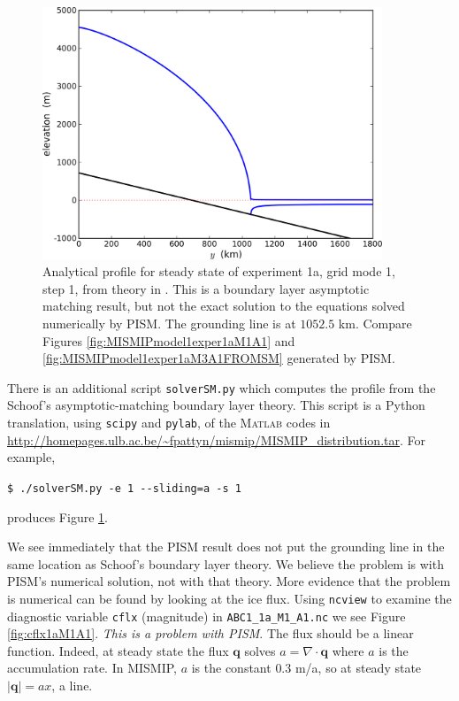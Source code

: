 \documentclass[11pt,final]{amsart}
\newcommand{\Matlab}{\textsc{Matlab}\xspace}
\newcommand{\bq}{\mathbf{q}}
\newcommand{\Div}{\nabla\cdot}
\begin{document}
\begin{figure}[ht]
\includegraphics[width=4.0in,keepaspectratio=true]{SM_1a_A1}
\caption{Analytical profile for steady state of experiment 1a, grid mode 1, step 1, from theory in \cite{SchoofMarine1}.  This is a boundary layer asymptotic matching result, but not the exact solution to the equations solved numerically by PISM.  The grounding line is at $1052.5$ km.  Compare Figures \ref{fig:MISMIPmodel1exper1aM1A1} and \ref{fig:MISMIPmodel1exper1aM3A1FROMSM} generated by PISM.}
\label{fig:SMexper1aM1A1}
\end{figure}

There is an additional script \verb|solverSM.py| which computes the profile from the Schoof's \cite{SchoofMarine1} asymptotic-matching boundary layer theory.  This script is a Python translation, using \verb|scipy| and \verb|pylab|, of the \Matlab codes in \url{http://homepages.ulb.ac.be/~fpattyn/mismip/MISMIP_distribution.tar}.  For example,

\verb|$ ./solverSM.py -e 1 --sliding=a -s 1|

\noindent produces Figure \ref{fig:SMexper1aM1A1}.

We see immediately that the PISM result does not put the grounding line in the same location as Schoof's boundary layer theory.  We believe the problem is with PISM's numerical solution, not with that theory.  More evidence that the problem is numerical can be found by looking at the ice flux.  Using \verb|ncview| to examine the diagnostic variable \verb|cflx| (magnitude) in \verb|ABC1_1a_M1_A1.nc| we see Figure \ref{fig:cflx1aM1A1}.  \emph{This is a problem with PISM}.  The flux should be a linear function.  Indeed, at steady state the flux $\bq$ solves $a=\Div\bq$ where $a$ is the accumulation rate.  In MISMIP, $a$ is the constant $0.3$ m/a, so at steady state $|\bq| = a x$, a line.
\end{document}
